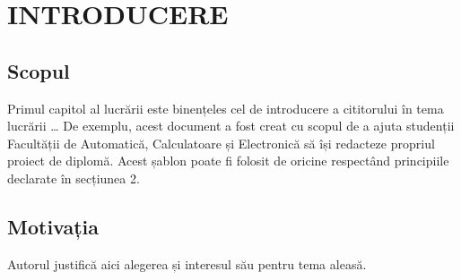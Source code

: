 \chapter{INTRODUCERE}

\section{Scopul}
Primul capitol al lucrării este binențeles cel de introducere a cititorului în tema lucrării …  
De exemplu, acest document a fost creat cu scopul de a ajuta studenții Facultății de Automatică, 
Calculatoare și Electronică să își redacteze propriul proiect de diplomă. Acest șablon poate fi folosit 
de oricine respectând principiile declarate în secțiunea 2. 

\section{Motivația}
Autorul justifică aici alegerea și interesul său pentru tema aleasă.